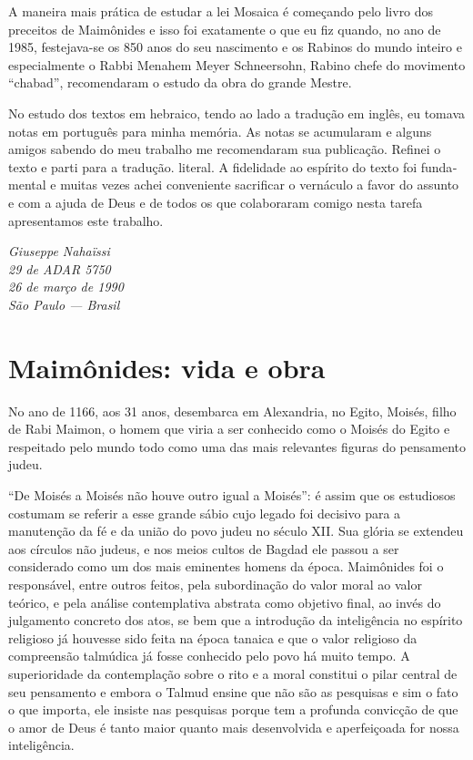 A maneira mais prática de estudar a lei Mosaica é começando pelo livro
dos preceitos de Maimônides e isso foi exatamente o que eu fiz quando,
no ano de 1985, festejava-se os 850 anos do seu nascimento e os Rabinos
do mundo inteiro e especialmente o Rabbi Menahem Meyer Schneersohn,
Rabino chefe do movimento ``chabad'', recomendaram o estudo da obra do
grande Mestre.

No estudo dos textos em hebraico, tendo ao lado a tradução em inglês, eu
tomava notas em português para minha memória. As notas se acumularam e
al­guns amigos sabendo do meu trabalho me recomendaram sua publicação.
Refinei o texto e parti para a tradução. literal. A fidelidade ao
espírito do texto foi funda­mental e muitas vezes achei conveniente
sacrificar o vernáculo a favor do assunto e com a ajuda de Deus e de
todos os que colaboraram comigo nesta tarefa apresen­tamos este
trabalho.

\begin{flushright}
\emph{Giuseppe Nahaïssi}\\
\emph{29 de ADAR 5750\\
26 de março de 1990\\
São Paulo --- Brasil}
\end{flushright}

\chapter{Maimônides: vida e obra}

No ano de 1166, aos 31 anos, desembarca em Alexandria, no Egito, Moisés,
filho de Rabi Maimon, o homem que viria a ser conhecido como o Moi­sés
do Egito e respeitado pelo mundo todo como uma das mais relevantes
figu­ras do pensamento judeu.

``De Moisés a Moisés não houve outro igual a Moisés'': é assim que os
estudiosos costumam se referir a esse grande sábio cujo legado foi
decisivo para a manutenção da fé e da união do povo judeu no século XII.
Sua glória se extendeu aos círculos não judeus, e nos meios cultos de
Bagdad ele passou a ser considerado como um dos mais eminentes homens da
época. Maimôni­des foi o responsável, entre outros feitos, pela
subordinação do valor moral ao valor teórico, e pela análise
contemplativa abstrata como objetivo final, ao invés do julgamento
concreto dos atos, se bem que a introdução da inteligên­cia no espírito
religioso já houvesse sido feita na época tanaica e que o valor
religioso da compreensão talmúdica já fosse conhecido pelo povo há muito
tem­po. A superioridade da contemplação sobre o rito e a moral constitui
o pilar central de seu pensamento e embora o Talmud ensine que não são
as pesquisas e sim o fato o que importa, ele insiste nas pesquisas
porque tem a profunda convicção de que o amor de Deus é tanto maior
quanto mais desenvolvida e aperfeiçoada for nossa inteligência.

